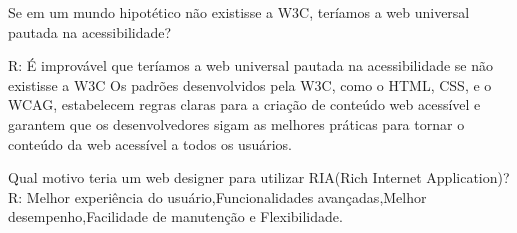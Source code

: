Se em um mundo hipotético não existisse a W3C,
teríamos a web universal pautada na acessibilidade?

R: É improvável que teríamos a web universal pautada na acessibilidade se não existisse a W3C
Os padrões desenvolvidos pela W3C, como o HTML, CSS, e o WCAG, 
estabelecem regras claras para a criação de conteúdo web acessível e garantem que os desenvolvedores 
sigam as melhores práticas para tornar o conteúdo da web acessível a todos os usuários.


Qual motivo teria um web designer para utilizar RIA(Rich Internet Application)?
R: Melhor experiência do usuário,Funcionalidades avançadas,Melhor desempenho,Facilidade de manutenção e 
Flexibilidade.